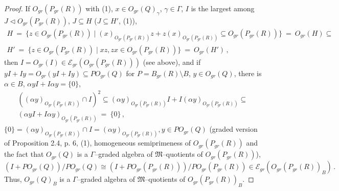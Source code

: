 \documentclass[a4paper,11pt]{article}
\begin{document}
\begin{proof}
If $O_{gr}(P_{gr}(R))$ with (1), ${x\in O_{gr}(Q)_{\gamma}}$, 
${\gamma\in \Gamma}$, $I$ is the largest among ${J\lhd O_{gr}(P_{gr}(R))}$, 
${J\subseteq H}$ (${J\subseteq H'}$, (1)), 
\begin{multline*}
H\ =\ \{z\in O_{gr}(P_{gr}(R))\mid 
(x)_{O_{gr}(P_{gr}(R))} z+z (x)_{O_{gr}(P_{gr}(R))}\subseteq 
O_{gr}(P_{gr}(R))\}\ =\ O_{gr}(H)\subseteq
\\ 
H'\ =\ \{z\in O_{gr}(P_{gr}(R))\mid x z, z x\in O_{gr}(P_{gr}(R))\}\ =\ 
O_{gr}(H')\,,
\end{multline*}
then ${I=O_{gr}(I)\in \mathcal{E}_{gr}(O_{gr}(P_{gr}(R)))}$ (see above), and 
if ${y I+I y=O_{gr}(y I+I y)\subseteq P O_{gr}(Q)}$ for 
${P=B_{gr}(R)\setminus B}$, ${y\in O_{gr}(Q)}$, 
there is ${\alpha\in B}$, ${\alpha y I+I \alpha y=\{0\}}$, 
\begin{multline*}
((\alpha y)_{O_{gr}(P_{gr}(R))}\cap I)^2\subseteq 
(\alpha y)_{O_{gr}(P_{gr}(R))} I+I (\alpha y)_{O_{gr}(P_{gr}(R))}\subseteq
\\ 
(\alpha y I+I \alpha y)_{O_{gr}(P_{gr}(R))}\ =\ \{0\}\,,
\end{multline*}
${\{0\}=(\alpha y)_{O_{gr}(P_{gr}(R))}\cap I=
(\alpha y)_{O_{gr}(P_{gr}(R))}, y\in P O_{gr}(Q)}$ 
(graded version of Proposition 2.4, p. 6, (1), homogeneous 
semiprimeness of $O_{gr}(P_{gr}(R))$ and the fact that $O_{gr}(Q)$ 
is a $\Gamma$--graded algebra of $\mathfrak{M}$--quotients of 
$O_{gr}(P_{gr}(R))$),
\[
(I+P O_{gr}(Q))/P O_{gr}(Q)\cong (I+P O_{gr}(P_{gr}(R)))/
P O_{gr}(P_{gr}(R))\in \mathcal{E}_{gr}(O_{gr}(P_{gr}(R))_B)\,.
\]
Thus, $O_{gr}(Q)_B$ is a $\Gamma$--graded algebra of $\mathfrak{M}$--quotients 
of $O_{gr}(P_{gr}(R))_B$. 


\end{proof}
\end{document}
